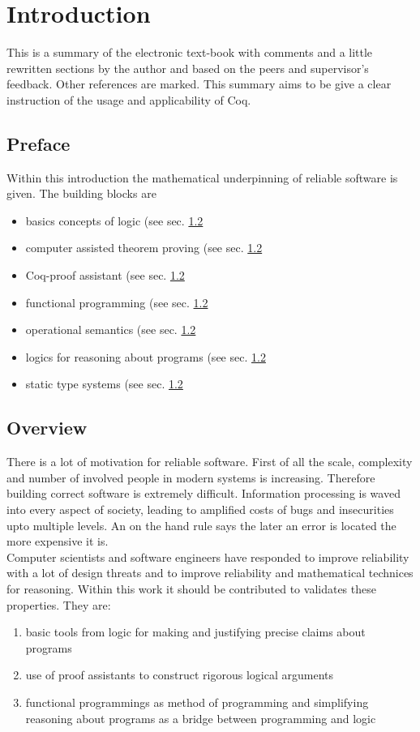 \section{Introduction}

This is a summary of the electronic text-book \cite{PACGGHSY} with comments and a little rewritten sections by the author and based on the peers and supervisor's feedback. 
Other references are marked. 
This summary aims to be give a clear instruction of the usage and applicability of Coq.\\

\subsection{Preface}

Within this introduction the mathematical underpinning of reliable software is given.
The building blocks are
\begin{itemize}
\item basics concepts of logic (see sec. \ref{} %
\item computer assisted theorem proving (see sec. \ref{} %
\item Coq-proof assistant (see sec. \ref{} %
\item functional programming (see sec. \ref{} %
\item operational semantics (see sec. \ref{} %
\item logics for reasoning about programs (see sec. \ref{} %
\item static type systems (see sec. \ref{} %
\end{itemize} 


\subsection{Overview}

There is a lot of motivation for reliable software. 
First of all the scale, complexity and number of involved people in modern systems is increasing.
Therefore building correct software is extremely difficult.
Information processing is waved into every aspect of society, leading to amplified costs of bugs and insecurities upto multiple levels. An on the hand rule says the later an error is located the more expensive it is.\\
Computer scientists and software engineers have responded to improve reliability with a lot of design threats and to improve reliability and mathematical technices for reasoning.
Within this work it should be contributed to validates these properties. 
They are:
\begin{enumerate}
\item basic tools from logic for making and justifying precise claims about programs
\item use of proof assistants to construct rigorous logical arguments
\item functional programmings as method of programming and simplifying reasoning about programs as a bridge between programming and logic
\end{enumerate}




